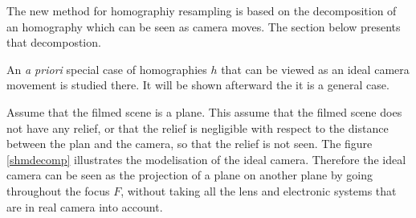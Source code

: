 The new method for homographiy resampling is based on the decomposition of an homography which can be seen as camera moves. The section below presents that decompostion.



\label{mouv_de_camera}

An \emph{a priori} special case of homographies $h$ that can be viewed as an ideal camera movement is studied there. It will be shown afterward the it is a general case.

Assume that the filmed scene is a plane. This assume that the filmed scene does not have any relief, or that the relief is negligible with respect to the distance between the plan and the camera, so that the relief is not seen. The figure \ref{shmdecomp} illustrates the modelisation of the ideal camera. Therefore the ideal camera can be seen as the projection of a plane on another plane by going throughout the focus $F$, without taking all the lens and electronic systems that are in real camera into account.


